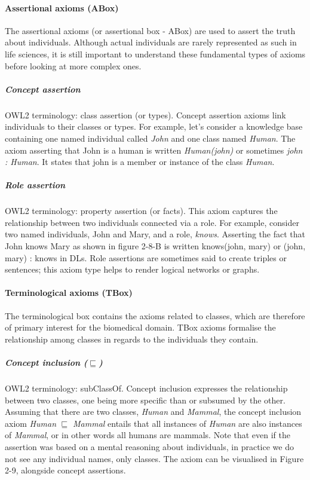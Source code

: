 \paragraph{\textbf{Assertional axioms (ABox)}\\}
The assertional axioms (or assertional box - ABox) are used to assert the truth about individuals. Although actual individuals are rarely represented as such in life sciences, it is still important to understand these fundamental types of axioms before looking at more complex ones.

\subparagraph{Concept assertion\\}
OWL2 terminology: class assertion (or types). Concept assertion axioms link individuals to their classes or types. For example, let's consider a knowledge base containing one named individual called \emph{John} and one class named \emph{Human}. The axiom asserting that John is a human is written \emph{Human(john)} or sometimes \emph{john : Human}. It states that john is a member or instance of the class \emph{Human}.

\subparagraph{Role assertion\\}
OWL2 terminology: property assertion (or facts). This axiom captures the relationship between two individuals connected via a role. For example, consider two named individuals, John and Mary, and a role, \emph{knows}. Asserting the fact that John knows Mary as shown in figure 2-8-B is written knows(john, mary) or (john, mary) : knows in DLs. Role assertions are sometimes said to create triples or sentences; this axiom type helps to render logical networks or graphs.

\paragraph{\textbf{Terminological axioms (TBox)}\\}

The terminological box contains the axioms related to classes, which are therefore of primary interest for the biomedical domain. TBox axioms formalise the relationship among classes in regards to the individuals they contain.

\subparagraph{Concept inclusion ($ \sqsubseteq $)\\}
OWL2 terminology: subClassOf. Concept inclusion expresses the relationship between two classes, one being more specific than or subsumed by the other. Assuming that there are two classes, \emph{Human} and \emph{Mammal}, the concept inclusion axiom \emph{Human} $ \sqsubseteq $ \emph{Mammal} entails that all instances of \emph{Human} are also instances of \emph{Mammal}, or in other words all humans are mammals. Note that even if the assertion was based on a mental reasoning about individuals, in practice we do not see any individual names, only classes. The axiom can be visualised in Figure 2-9, alongside concept assertions.

